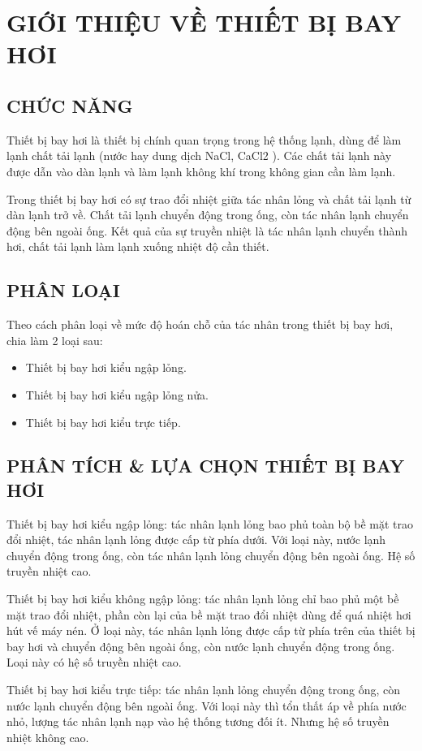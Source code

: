 \section{GIỚI THIỆU VỀ THIẾT BỊ BAY HƠI}
\subsection{CHỨC NĂNG}
Thiết bị bay hơi là thiết bị chính quan trọng trong hệ thống lạnh, dùng để làm lạnh chất tải lạnh (nước hay dung dịch NaCl, CaCl{\scriptsize 2} ). Các chất tải lạnh này được dẫn vào dàn lạnh và làm lạnh không khí trong không gian cần làm lạnh.

Trong thiết bị bay hơi có sự trao đổi nhiệt giữa tác nhân lỏng và chất tải lạnh từ dàn lạnh trở về. Chất tải lạnh chuyển động trong ống, còn tác nhân lạnh chuyển động bên ngoài ống. Kết quả của sự truyền nhiệt là tác nhân lạnh chuyển thành hơi, chất tải lạnh làm lạnh xuống nhiệt độ cần thiết.

\subsection{PHÂN LOẠI}
Theo cách phân loại về mức độ hoán chỗ của tác nhân trong thiết bị bay hơi, chia làm 2 loại sau:
\begin{itemize}
	\item Thiết bị bay hơi kiểu ngập lỏng.
	\item Thiết bị bay hơi kiểu ngập lỏng nửa.
	\item Thiết bị bay hơi kiểu trực tiếp.
\end{itemize}
\subsection{PHÂN TÍCH \& LỰA CHỌN THIẾT BỊ BAY HƠI}
Thiết bị bay hơi kiểu ngập lỏng: tác nhân lạnh lỏng bao phủ toàn bộ bề mặt trao đổi nhiệt, tác nhân lạnh lỏng được cấp từ phía dưới. Với loại này, nước lạnh chuyển động trong ống, còn tác nhân lạnh lỏng chuyển động bên ngoài ống. Hệ số truyền nhiệt cao.

Thiết bị bay hơi kiểu không ngập lỏng: tác nhân lạnh lỏng chỉ bao phủ một bề mặt trao đổi nhiệt, phần còn lại của bề mặt trao đổi nhiệt dùng để quá nhiệt hơi hút vế máy nén. Ở loại này, tác nhân lạnh lỏng được cấp từ phía trên của thiết bị bay hơi và chuyển động bên ngoài ống, còn nước lạnh chuyển động trong ống. Loại này có hệ số truyền nhiệt cao.

Thiết bị bay hơi kiểu trực tiếp: tác nhân lạnh lỏng chuyển động trong ống, còn nước lạnh chuyển động bên ngoài ống. Với loại này thì tổn thất áp về phía nước nhỏ, lượng tác nhân lạnh nạp vào hệ thống tương đối ít. Nhưng hệ số truyền nhiệt không cao.


